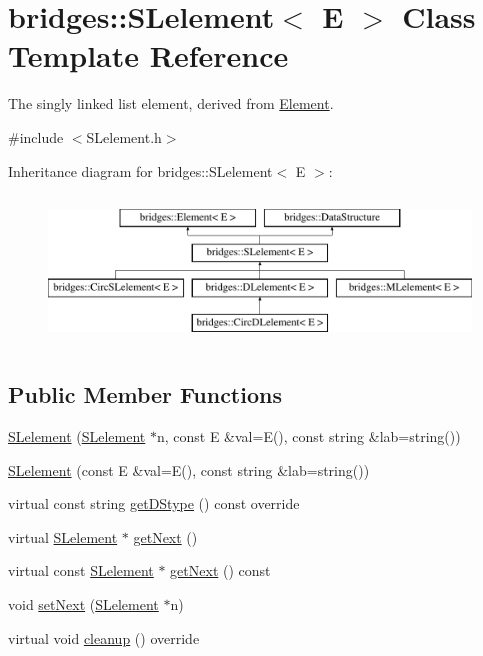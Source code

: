 \hypertarget{classbridges_1_1_s_lelement}{}\section{bridges\+:\+:S\+Lelement$<$ E $>$ Class Template Reference}
\label{classbridges_1_1_s_lelement}


The singly linked list element, derived from \hyperlink{classbridges_1_1_element}{Element}.  




{\ttfamily \#include $<$S\+Lelement.\+h$>$}

Inheritance diagram for bridges\+:\+:S\+Lelement$<$ E $>$\+:\begin{figure}[H]
\begin{center}
\leavevmode
\includegraphics[height=4.000000cm]{classbridges_1_1_s_lelement}
\end{center}
\end{figure}
\subsection*{Public Member Functions}
\begin{DoxyCompactItemize}
\item 
\hyperlink{classbridges_1_1_s_lelement_a9ddac46a935b85cde76305135d16de0a}{S\+Lelement} (\hyperlink{classbridges_1_1_s_lelement}{S\+Lelement} $\ast$n, const E \&val=E(), const string \&lab=string())
\item 
\hyperlink{classbridges_1_1_s_lelement_a76423021747b1f2090847c418c13352b}{S\+Lelement} (const E \&val=E(), const string \&lab=string())
\item 
virtual const string \hyperlink{classbridges_1_1_s_lelement_a74aece34b334c1d4318694312d70ce89}{get\+D\+Stype} () const  override
\item 
virtual \hyperlink{classbridges_1_1_s_lelement}{S\+Lelement} $\ast$ \hyperlink{classbridges_1_1_s_lelement_a5bd74108a9aa49339378bf62cdbb19ca}{get\+Next} ()
\item 
virtual const \hyperlink{classbridges_1_1_s_lelement}{S\+Lelement} $\ast$ \hyperlink{classbridges_1_1_s_lelement_a1d247f34c384e7ef162148320a4946fe}{get\+Next} () const 
\item 
void \hyperlink{classbridges_1_1_s_lelement_a347f8809406f930ce83bf44764a4f1b5}{set\+Next} (\hyperlink{classbridges_1_1_s_lelement}{S\+Lelement} $\ast$n)
\item 
virtual void \hyperlink{classbridges_1_1_s_lelement_ac747648849874407e9d907bb4557dd52}{cleanup} () override
\end{DoxyCompactItemize}
